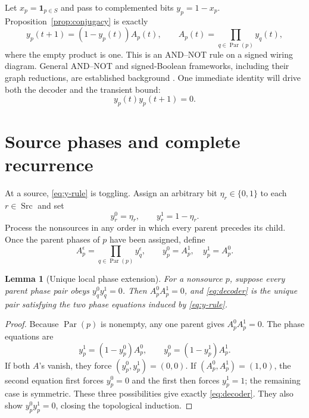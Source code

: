 \documentclass[10pt,a4paper]{amsart}
\newtheorem{lemma}[theorem]{Lemma}
\theoremstyle{definition}
\theoremstyle{remark}
\newcommand{\Par}{\operatorname{Par}}
\newcommand{\Src}{\operatorname{Src}}
\begin{document}
Let $x_p=\mathbf1_{p\in S}$ and pass to complemented bits
$y_p=1-x_p$.  Proposition~\ref{prop:conjugacy} is exactly
\begin{equation}\label{eq:y-rule}
 y_p(t+1)=(1-y_p(t))A_p(t),\qquad
 A_p(t)=\prod_{q\in\Par(p)}y_q(t),
\end{equation}
where the empty product is one.  This is an AND--NOT rule on a signed
wiring diagram.  General AND--NOT and signed-Boolean frameworks, including
their graph reductions, are established background
\cite{VelizCubaEtAl2012,AracenaCabreraCrotSalinas2021}.
One immediate identity will drive both the decoder and the transient bound:
\begin{equation}\label{eq:consecutive-zero}
                              y_p(t)y_p(t+1)=0.
\end{equation}

\section{Source phases and complete recurrence}

At a source, \eqref{eq:y-rule} is toggling.  Assign an arbitrary bit
$\eta_r\in\{0,1\}$ to each $r\in\Src$ and set
\begin{equation}\label{eq:source-phase}
                          y_r^0=\eta_r,\qquad y_r^1=1-\eta_r.
\end{equation}
Process the nonsources in any order in which every parent precedes its
child.  Once the parent phases of $p$ have been assigned, define
\begin{equation}\label{eq:decoder}
 A_p^\epsilon=\prod_{q\in\Par(p)}y_q^\epsilon,\qquad
                         y_p^0=A_p^1,\quad y_p^1=A_p^0.
\end{equation}

\begin{lemma}[Unique local phase extension]\label{lem:phase}
For a nonsource $p$, suppose every parent phase pair obeys
$y_q^0y_q^1=0$.  Then $A_p^0A_p^1=0$, and \eqref{eq:decoder} is the unique
pair satisfying the two phase equations induced by \eqref{eq:y-rule}.
\end{lemma}

\begin{proof}
Because $\Par(p)$ is nonempty, any one parent gives
$A_p^0A_p^1=0$.  The phase equations are
\[
 y_p^1=(1-y_p^0)A_p^0,\qquad
 y_p^0=(1-y_p^1)A_p^1.
\]
If both $A$'s vanish, they force $(y_p^0,y_p^1)=(0,0)$.  If
$(A_p^0,A_p^1)=(1,0)$, the second equation first forces $y_p^0=0$ and the
first then forces $y_p^1=1$; the remaining case is symmetric.  These three
possibilities give exactly \eqref{eq:decoder}.  They also show
$y_p^0y_p^1=0$, closing the topological induction.
\end{proof}
\end{document}
